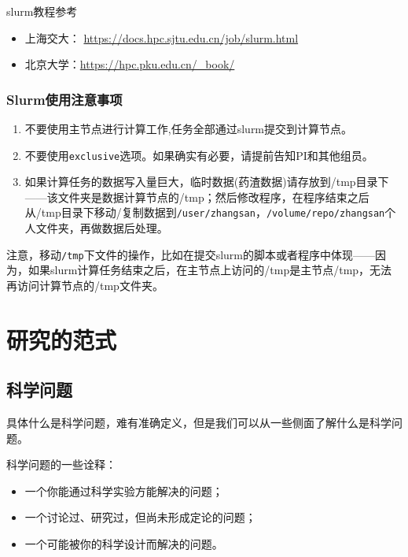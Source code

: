 \documentclass[
]{ctexbook}
\providecommand{\tightlist}{%
  \setlength{\itemsep}{0pt}\setlength{\parskip}{0pt}}
\begin{document}
slurm教程参考

\begin{itemize}
\tightlist
\item
  上海交大： \url{https://docs.hpc.sjtu.edu.cn/job/slurm.html}
\item
  北京大学：\url{https://hpc.pku.edu.cn/_book/}
\end{itemize}

\hypertarget{slurmux4f7fux7528ux6ce8ux610fux4e8bux9879}{%
\subsection{Slurm使用注意事项}\label{slurmux4f7fux7528ux6ce8ux610fux4e8bux9879}}

\begin{enumerate}
\def\labelenumi{\arabic{enumi}.}
\tightlist
\item
  不要使用主节点进行计算工作,任务全部通过slurm提交到计算节点。
\item
  不要使用\texttt{exclusive}选项。如果确实有必要，请提前告知PI和其他组员。
\item
  如果计算任务的数据写入量巨大，临时数据(药渣数据)请存放到/tmp目录下------该文件夹是数据计算节点的/tmp；然后修改程序，在程序结束之后从/tmp目录下移动/复制数据到\texttt{/user/zhangsan}，\texttt{/volume/repo/zhangsan}个人文件夹，再做数据后处理。
\end{enumerate}

注意，移动\texttt{/tmp}下文件的操作，比如在提交slurm的脚本或者程序中体现------因为，如果slurm计算任务结束之后，在主节点上访问的/tmp是主节点/tmp，无法再访问计算节点的/tmp文件夹。

\hypertarget{ResNormal}{%
\chapter{研究的范式}\label{ResNormal}}

\hypertarget{ux79d1ux5b66ux95eeux9898}{%
\section{科学问题}\label{ux79d1ux5b66ux95eeux9898}}

具体什么是科学问题，难有准确定义，但是我们可以从一些侧面了解什么是科学问题。

科学问题的一些诠释：

\begin{itemize}
\tightlist
\item
  一个你能通过科学实验方能解决的问题；
\item
  一个讨论过、研究过，但尚未形成定论的问题；
\item
  一个可能被你的科学设计而解决的问题。
\end{itemize}
\end{document}
